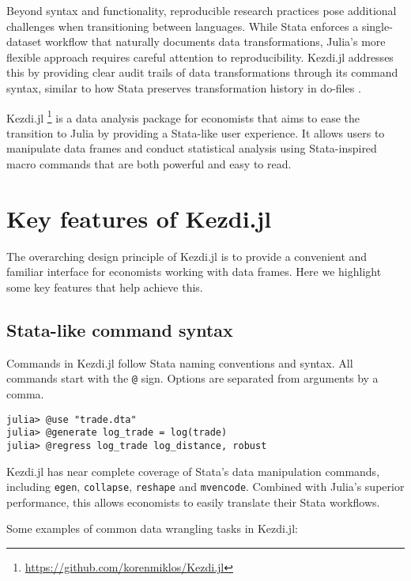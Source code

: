 \documentclass{juliacon}
\begin{document}
Beyond syntax and functionality, reproducible research practices pose additional challenges when transitioning between languages. While Stata enforces a single-dataset workflow that naturally documents data transformations, Julia's more flexible approach requires careful attention to reproducibility. Kezdi.jl addresses this by providing clear audit trails of data transformations through its command syntax, similar to how Stata preserves transformation history in do-files \cite{koren2024ten}.

Kezdi.jl \footnote{\url{https://github.com/korenmiklos/Kezdi.jl}} is a data analysis package for economists that aims to ease the transition to Julia by providing a Stata-like user experience. It allows users to manipulate data frames and conduct statistical analysis using Stata-inspired macro commands that are both powerful and easy to read.

\section{Key features of Kezdi.jl}

The overarching design principle of Kezdi.jl is to provide a convenient and familiar interface for economists working with data frames. Here we highlight some key features that help achieve this.

\subsection{Stata-like command syntax}

Commands in Kezdi.jl follow Stata naming conventions and syntax. All commands start with the \texttt{@} sign. Options are separated from arguments by a comma.

\begin{verbatim}
julia> @use "trade.dta"
julia> @generate log_trade = log(trade)
julia> @regress log_trade log_distance, robust
\end{verbatim}

Kezdi.jl has near complete coverage of Stata's data manipulation commands, including \texttt{egen}, \texttt{collapse}, \texttt{reshape} and \texttt{mvencode}. Combined with Julia's superior performance, this allows economists to easily translate their Stata workflows.

Some examples of common data wrangling tasks in Kezdi.jl:
\end{document}
